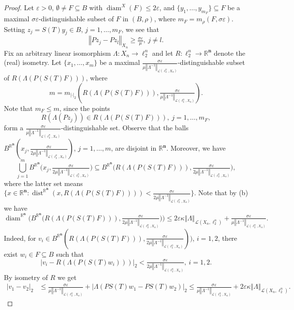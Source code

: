 \documentclass[a4paper,12pt,reqno]{amsart}
\theoremstyle{plain}
\theoremstyle{definition}
\numberwithin{equation}{section}
\newcommand{\R}{\mathbb{R}}
\newcommand{\norm}[1]{\left\Vert#1\right\Vert}
\newcommand{\abs}[1]{\left\vert#1\right\vert}
\newcommand{\eps}{\varepsilon}
\newcommand{\diam}{\operatorname{diam}}
\newcommand{\dist}{\operatorname{dist}}
\renewcommand{\geq}{\geqslant}
\renewcommand{\leq}{\leqslant}
\begin{document}
\begin{proof}
Let $\eps>0$, $\emptyset\neq F\subseteq B$ with $\diam^{X}(F)\leq 2\eps$, and $\{y_1,\ldots,y_{m_{F}}\}\subseteq F$ be a  maximal $\sigma\eps$-distinguishable subset of $F$ in $(B,\rho)$, where  $m_{F}=m_{\rho}(F,\sigma\eps)$. Setting $z_j=S(T)y_j\in B$, $j=1,\ldots,m_{F}$, we see that
$$\norm{Pz_j-Pz_l}_{X_n}\geq\tfrac{\sigma\eps}{\mu},\ j\neq l.$$
Fix an arbitrary linear isomorphism $\Lambda\colon X_{n}\to\ell^{n}_2$ and let $R\colon\ell^n_2\to\R^{\mathbf{n}}$ denote the (real) isometry. Let 
$\{x_1,\ldots,x_{m}\}$ be a maximal $\frac{\sigma\eps}{\mu\norm{\Lambda^{-1}}_{\mathcal{L}(\ell^n_2,X_n)}}$-distinguishable subset of $R(\Lambda(P(S(T)F)))$, where
$$m=m_{|\cdot|_{2}}(R(\Lambda(P(S(T)F))),\tfrac{\sigma\eps}{\mu\norm{\Lambda^{-1}}_{\mathcal{L}(\ell^n_2,X_n)}}).$$ 
Note that $m_{F}\leq m$,
since the points
$$R(\Lambda(Pz_j))\in R(\Lambda(P(S(T)F))),\ j=1,\ldots,m_{F},$$ 
form a $\frac{\sigma\eps}{\mu\norm{\Lambda^{-1}}_{\mathcal{L}(\ell^n_2,X_n)}}$-distinguishable set.
Observe that the balls $B^{\R^{\mathbf{n}}}(x_j,\frac{\sigma\eps}{2\mu\norm{\Lambda^{-1}}_{\mathcal{L}(\ell^n_2,X_n)}})$, $j=1,\ldots,m$, are disjoint in $\R^\mathbf{n}$. Moreover, we have
\begin{equation}\label{e:FORVOLUMES}
\bigcup_{j=1}^{m}B^{\R^\mathbf{n}}\Big(x_j,\tfrac{\sigma\eps}{2\mu\norm{\Lambda^{-1}}_{\mathcal{L}(\ell^n_2,X_n)}}\Big)\subseteq B^{\R^\mathbf{n}}\Big(R(\Lambda(P(S(T)F))),\tfrac{\sigma\eps}{2\mu\norm{\Lambda^{-1}}_{\mathcal{L}(\ell^n_2,X_n)}}\Big),
\end{equation}
where the latter set means $\{x\in\R^\mathbf{n}\colon \dist^{\R^\textbf{n}}(x,R(\Lambda(P(S(T)F))))<\frac{\sigma\eps}{2\mu\norm{\Lambda^{-1}}_{\mathcal{L}(\ell^n_2,X_n)}}\}$.
Note that by (b) we have
$$\diam^{\R^{\mathbf{n}}}\Big(B^{\R^\mathbf{n}}\Big(R(\Lambda(P(S(T)F))),\tfrac{\sigma\eps}{2\mu\norm{\Lambda^{-1}}_{\mathcal{L}(\ell^n_2,X_n)}}\Big)\Big)\leq 2\eps\kappa\norm{\Lambda}_{\mathcal{L}(X_n,\ell^n_2)}+\tfrac{\sigma\eps}{\mu\norm{\Lambda^{-1}}_{\mathcal{L}(\ell^n_2,X_n)}}.$$
Indeed, for $v_i\in B^{\R^\mathbf{n}}(R(\Lambda(P(S(T)F))),\frac{\sigma\eps}{2\mu\norm{\Lambda^{-1}}_{\mathcal{L}(\ell^n_2,X_n)}}))$, $i=1,2$, there exist $w_i\in F\subseteq B$ such that
$$\abs{v_i-R(\Lambda(P(S(T)w_i)))}_{2}<\tfrac{\sigma\eps}{2\mu\norm{\Lambda^{-1}}_{\mathcal{L}(\ell^n_2,X_n)}},\ i=1,2.$$
By isometry of $R$ we get
\begin{equation*}
\begin{split}
\abs{v_1-v_2}_{2}&\leq \tfrac{\sigma\eps}{\mu\norm{\Lambda^{-1}}_{\mathcal{L}(\ell^n_2,X_n)}}+\abs{\Lambda(PS(T)w_1-PS(T)w_2)}_{2}\leq\tfrac{\sigma\eps}{\mu\norm{\Lambda^{-1}}_{\mathcal{L}(\ell^n_2,X_n)}}+2\eps\kappa\norm{\Lambda}_{\mathcal{L}(X_n,\ell^n_2)}.

\end{split}
\end{equation*}
\end{proof}
\end{document}
